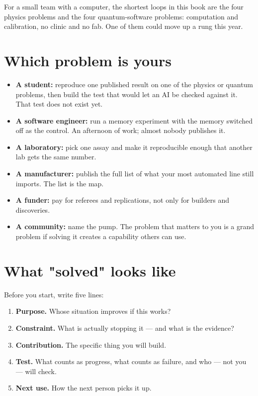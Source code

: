 \documentclass[11pt]{article}
\begin{document}
For a small team with a computer, the shortest loops in this book are the four physics problems and the four quantum-software problems: computation and calibration, no clinic and no fab. One of them could move up a rung this year.

\section*{Which problem is yours}

\begin{itemize}[leftmargin=1.4em,itemsep=2pt]
\item \textbf{A student:} reproduce one published result on one of the physics or quantum problems, then build the test that would let an AI be checked against it. That test does not exist yet.
\item \textbf{A software engineer:} run a memory experiment with the memory switched off as the control. An afternoon of work; almost nobody publishes it.
\item \textbf{A laboratory:} pick one assay and make it reproducible enough that another lab gets the same number.
\item \textbf{A manufacturer:} publish the full list of what your most automated line still imports. The list is the map.
\item \textbf{A funder:} pay for referees and replications, not only for builders and discoveries.
\item \textbf{A community:} name the pump. The problem that matters to you is a grand problem if solving it creates a capability others can use.
\end{itemize}

\section*{What "solved" looks like}

Before you start, write five lines:

\begin{enumerate}[leftmargin=1.6em,itemsep=2pt]
\item \textbf{Purpose.} Whose situation improves if this works?
\item \textbf{Constraint.} What is actually stopping it --- and what is the evidence?
\item \textbf{Contribution.} The specific thing you will build.
\item \textbf{Test.} What counts as progress, what counts as failure, and who --- not you --- will check.
\item \textbf{Next use.} How the next person picks it up.
\end{enumerate}
\end{document}
